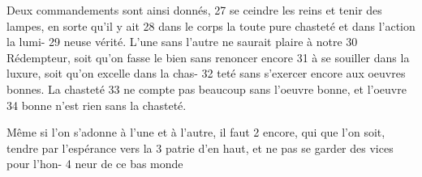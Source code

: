 Deux commandements sont ainsi donnés,	 
27	 	se ceindre les reins et tenir des lampes, en sorte qu'il y ait	 
28	 	dans le corps la toute pure chasteté et dans l'action la lumi-	 
29	 	neuse vérité. L'une sans l'autre ne saurait plaire à notre	 
30	 	Rédempteur, soit qu'on fasse le bien sans renoncer encore	 
31	 	à se souiller dans la luxure, soit qu'on excelle dans la chas-	 
32	 	teté sans s'exercer encore aux oeuvres bonnes. La chasteté	 
33	 	ne compte pas beaucoup sans l'oeuvre bonne, et l'oeuvre	 
34	 	bonne n'est rien sans la chasteté.

Même si l'on s'adonne à l'une et à l'autre, il faut	 
2	 	encore, qui que l'on soit, tendre par l'espérance vers la	 
3	 	patrie d'en haut, et ne pas se garder des vices pour l'hon-	 
4	 	neur de ce bas monde
